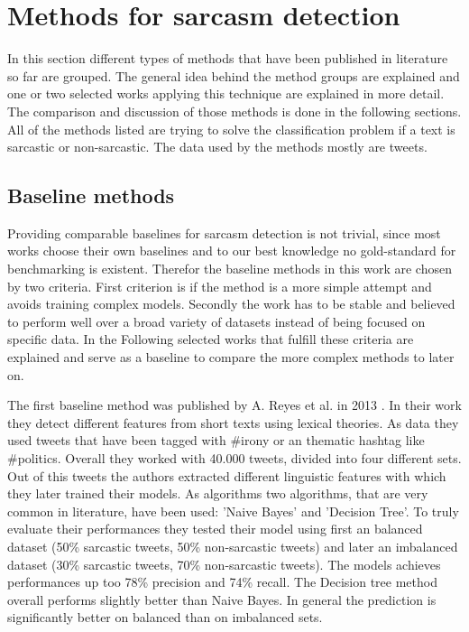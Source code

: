 \documentclass[sigconf,  review=false, nonacm=true]{acmart}
\begin{document}
\section{Methods for sarcasm detection}

In this section different types of methods that have been published in literature so far are grouped. The general idea behind the method groups are explained and one or two selected works applying this technique are explained in more detail. The comparison and discussion of those methods is done in the following sections.
All of the methods listed are trying to solve the classification problem if a text is sarcastic or non-sarcastic. The data used by the methods mostly are tweets.

\subsection{Baseline methods}

Providing comparable baselines for sarcasm detection is not trivial, since most works choose their own baselines and to our best knowledge no gold-standard for benchmarking is existent. Therefor the baseline methods in this work are chosen by two criteria. First criterion is if the method is a more simple attempt and avoids training complex models. Secondly the work has to be stable and believed to perform well over a broad variety of datasets instead of being focused on specific data. 
In the Following selected works that fulfill these criteria are explained and serve as a baseline to compare the more complex methods to later on.

The first baseline method was published by A. Reyes et al. in 2013 \cite{A-multidimensional-approach-for-detecting-irony-in-Twitter}. In their work they detect different features from short texts using lexical theories. As data they used tweets that have been tagged with \#irony or an thematic hashtag like \#politics. Overall they worked with 40.000 tweets, divided into four different sets. Out of this tweets the authors extracted different linguistic features with which they later trained their models.
As algorithms two algorithms, that are very common in literature, have been used: 'Naive Bayes' and 'Decision Tree'. To truly evaluate their performances they tested their model using first an balanced dataset (50\% sarcastic tweets, 50\% non-sarcastic tweets) and later an imbalanced dataset (30\% sarcastic tweets, 70\% non-sarcastic tweets). The models achieves performances up too 78\% precision and 74\% recall. The Decision tree method overall performs slightly better than Naive Bayes. In general the prediction is significantly better on balanced than on imbalanced sets.
\end{document}
